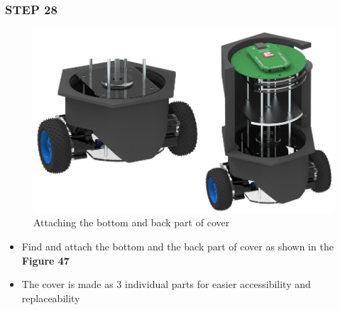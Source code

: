 \documentclass[12pt,a4paper,oneside]{book}
\begin{document}
			\subsubsection*{STEP 28}
				\begin{figure}[H]
					\begin{center}
						\includegraphics[scale=0.6]{ATTACHING COVER BOTTOM AND BACK}
						\caption{Attaching the bottom and back part of cover}
					\end{center}
				\end{figure}
				\begin{itemize}
					\item Find and attach the bottom and the back part of cover as shown in the \textbf{Figure 47}
					\item The cover is made as 3 individual parts for easier accessibility and replaceability
				\end{itemize}
				
\end{document}
